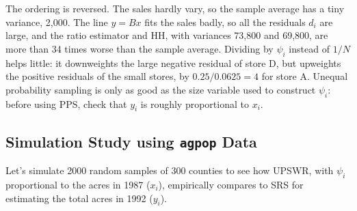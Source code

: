 \documentclass[
  letterpaper,
  DIV=11,
  numbers=noendperiod]{scrreprt}
\renewcommand{\[}{\begin{equation}}
\renewcommand{\]}{\end{equation}}
\begin{document}
The ordering is reversed. The sales hardly vary, so the sample average
has a tiny variance, 2,000. The line \(y=Bx\) fits the sales badly, so
all the residuals \(d_i\) are large, and the ratio estimator and HH,
with variances 73,800 and 69,800, are more than 34 times worse than the
sample average. Dividing by \(\psi_i\) instead of \(1/N\) helps little:
it downweights the large negative residual of store D, but upweights the
positive residuals of the small stores, by \(0.25/0.0625=4\) for store
A. Unequal probability sampling is only as good as the size variable
used to construct \(\psi_i\): before using PPS, check that \(y_i\) is
roughly proportional to \(x_i\).

\subsection{\texorpdfstring{Simulation Study using \texttt{agpop}
Data}{Simulation Study using agpop Data}}\label{sec-ups-sim}

Let's simulate 2000 random samples of 300 counties to see how UPSWR,
with \(\psi_i\) proportional to the acres in 1987 (\(x_i\)), empirically
compares to SRS for estimating the total acres in 1992 (\(y_i\)).
\end{document}

